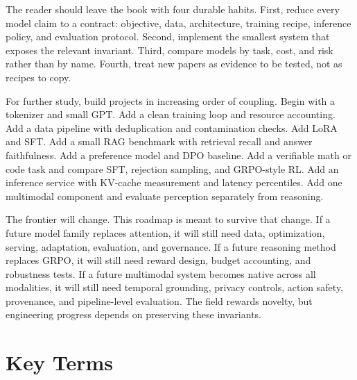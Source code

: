 The reader should leave the book with four durable habits. First, reduce every model claim to a contract: objective, data, architecture, training recipe, inference policy, and evaluation protocol. Second, implement the smallest system that exposes the relevant invariant. Third, compare models by task, cost, and risk rather than by name. Fourth, treat new papers as evidence to be tested, not as recipes to copy.

For further study, build projects in increasing order of coupling. Begin with a tokenizer and small GPT. Add a clean training loop and resource accounting. Add a data pipeline with deduplication and contamination checks. Add LoRA and SFT. Add a small RAG benchmark with retrieval recall and answer faithfulness. Add a preference model and DPO baseline. Add a verifiable math or code task and compare SFT, rejection sampling, and GRPO-style RL. Add an inference service with KV-cache measurement and latency percentiles. Add one multimodal component and evaluate perception separately from reasoning.

The frontier will change. This roadmap is meant to survive that change. If a future model family replaces attention, it will still need data, optimization, serving, adaptation, evaluation, and governance. If a future reasoning method replaces GRPO, it will still need reward design, budget accounting, and robustness tests. If a future multimodal system becomes native across all modalities, it will still need temporal grounding, privacy controls, action safety, provenance, and pipeline-level evaluation. The field rewards novelty, but engineering progress depends on preserving these invariants.

\section{Key Terms}
\label{sec:frontier-key-terms}

